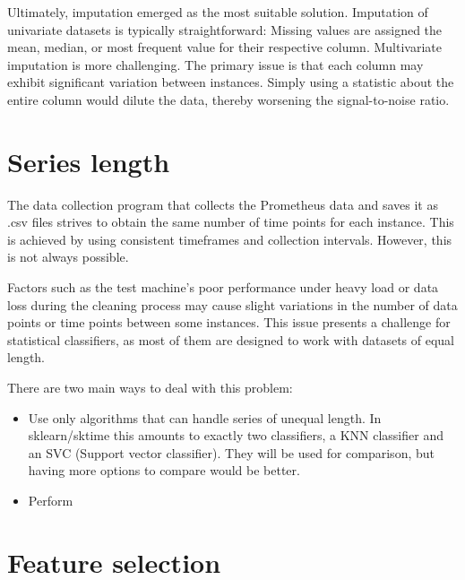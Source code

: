 Ultimately, imputation emerged as the most suitable solution. Imputation of univariate datasets is typically straightforward: Missing values are assigned the mean, median, or most frequent value for their respective column. Multivariate imputation is more challenging. The primary issue is that each column may exhibit significant variation between instances. Simply using a statistic about the entire column would dilute the data, thereby worsening the signal-to-noise ratio.
\section{Series length}
The data collection program that collects the Prometheus data and saves it as .csv files strives to obtain the same number of time points for each instance. This is achieved by using consistent timeframes and collection intervals. However, this is not always possible.

Factors such as the test machine's poor performance under heavy load or data loss during the cleaning process may cause slight variations in the number of data points or time points between some instances. This issue presents a challenge for statistical classifiers, as most of them are designed to work with datasets of equal length.

There are two main ways to deal with this problem:
\begin{itemize}
    \item Use only algorithms that can handle series of unequal length. In sklearn/sktime this amounts to exactly two classifiers, a KNN classifier and an SVC (Support vector classifier). They will be used for comparison, but having more options to compare would be better.
    \item Perform 
\end{itemize}

\section{Feature selection}
